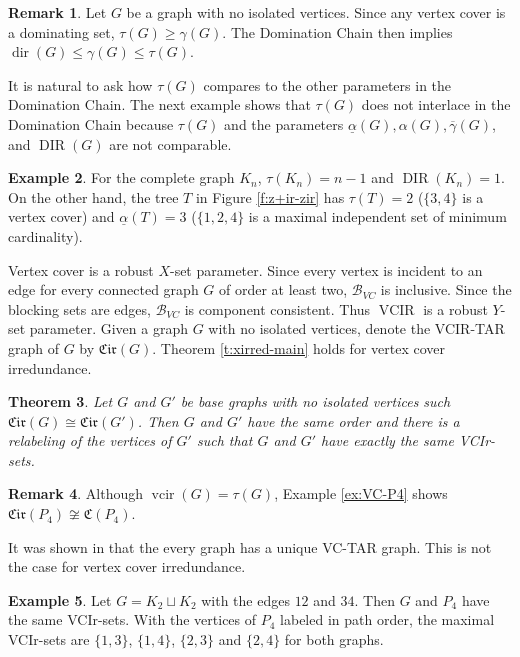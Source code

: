 \documentclass{article}
\numberwithin{figure}{section}
\numberwithin{table}{section}
\numberwithin{equation}{section}
\newtheorem{thm}{Theorem}[section]
\theoremstyle{definition}
\newtheorem{rem}[thm]{Remark}
\theoremstyle{definition}
\theoremstyle{definition}
\newtheorem{ex}[thm]{Example}
\newcommand{\B}{\mathcal{B}}
\newcommand{\ol}{\overline}
\newcommand{\vc}{\tau}
\newcommand{\dbar}{\ol\gamma}
\newcommand{\ibar}{\underline{\alpha}}
\newcommand{\vctar}{\mathfrak{C}}%
\newcommand{\vcirtar}{\mathfrak{Cir}}%
\DeclareMathOperator{\dir}{dir}
\DeclareMathOperator{\DIR}{DIR}
\DeclareMathOperator{\VCIR}{VCIR}
\DeclareMathOperator{\vcir}{vcir}
\begin{document}
 \begin{rem} Let $G$ be a graph with no isolated vertices.  Since any vertex cover is a dominating set,  $\tau(G)\ge \gamma(G)$. The Domination Chain then  implies $\dir(G) \leq \gamma(G)\le \tau(G)$.
 \end{rem}


It is  natural  to ask  how $\vc(G)$ compares to the other parameters in the Domination Chain. The next example shows that $\vc(G)$ does not interlace in the Domination Chain because $\vc(G)$ and  the parameters $\ibar(G), \alpha(G), \dbar(G)$, and 
 $\DIR(G)$ are not comparable.

 \begin{ex}
     For the complete graph $K_n$, $\vc(K_n)=n-1$ and $\DIR(K_n)=1$. On the other hand,  the tree $T$ in Figure \ref{f:z+ir-zir} has $\vc(T)=2$  ($\{3,4\}$ is a vertex cover) and  $\ibar(T)=3$ ($\{1,2,4\}$ is a maximal independent set of minimum cardinality). 
 \end{ex}





 Vertex cover is a robust $X$-set parameter. Since every vertex is incident to an edge for every connected graph $G$ of order at least two, $\B_{VC}$ is inclusive.  Since the blocking sets are edges,  $\B_{VC}$ is component consistent. Thus $\VCIR$ is a robust $Y$-set parameter. Given a graph $G$ with no isolated vertices, denote the VCIR-TAR graph of $G$ by $\vcirtar(G)$. Theorem \ref{t:xirred-main} holds for vertex cover irredundance.

\begin{thm}\label{t:vcirmain}
    Let $G$ and $G'$ be base graphs with no isolated vertices such $\vcirtar(G)\cong\vcirtar(G')$. Then $G$ and $G'$ have the same order and there is a relabeling of the vertices of $G'$ such that $G$ and $G'$ have exactly the same VCIr-sets.
\end{thm}

\begin{rem}
    Although $\vcir(G)=\vc(G)$, Example \ref{ex:VC-P4} shows $\vcirtar(P_4)\not\cong\vctar(P_4)$.
\end{rem}



 It was shown in \cite{XTAR-YTAR} that the every graph has a unique VC-TAR graph. This is not the case for vertex cover irredundance.

\begin{ex}
    Let $G=K_2 \sqcup K_2$ with the edges $12$ and $34$. Then $G$ and $P_4$ have the same VCIr-sets. With the vertices of $P_4$ labeled in path order, the maximal VCIr-sets are $\{1,3\}$, $\{1,4\}$, $\{2,3\}$ and $\{2,4\}$ for both graphs. 
\end{ex}
\end{document}
